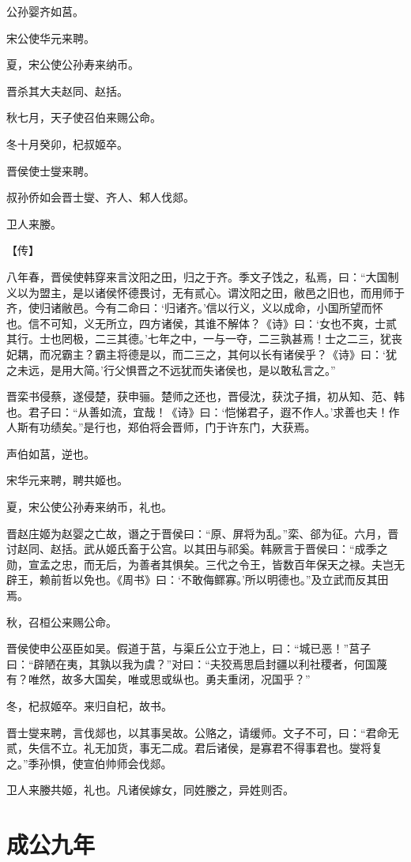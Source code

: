 \documentclass[a4paper,12pt,UTF8,twoside]{ctexbook}
\begin{document}
公孙婴齐如莒。

宋公使华元来聘。

夏，宋公使公孙寿来纳币。

晋杀其大夫赵同、赵括。

秋七月，天子使召伯来赐公命。

冬十月癸卯，杞叔姬卒。

晋侯使士燮来聘。

叔孙侨如会晋士燮、齐人、邾人伐郯。

卫人来媵。

【传】

八年春，晋侯使韩穿来言汶阳之田，归之于齐。季文子饯之，私焉，曰：“大国制义以为盟主，是以诸侯怀德畏讨，无有贰心。谓汶阳之田，敝邑之旧也，而用师于齐，使归诸敝邑。今有二命曰：‘归诸齐。’信以行义，义以成命，小国所望而怀也。信不可知，义无所立，四方诸侯，其谁不解体？《诗》曰：‘女也不爽，士贰其行。士也罔极，二三其德。’七年之中，一与一夺，二三孰甚焉！士之二三，犹丧妃耦，而况霸主？霸主将德是以，而二三之，其何以长有诸侯乎？《诗》曰：‘犹之未远，是用大简。’行父惧晋之不远犹而失诸侯也，是以敢私言之。”

晋栾书侵蔡，遂侵楚，获申骊。楚师之还也，晋侵沈，获沈子揖，初从知、范、韩也。君子曰：“从善如流，宜哉！《诗》曰：‘恺悌君子，遐不作人。’求善也夫！作人斯有功绩矣。”是行也，郑伯将会晋师，门于许东门，大获焉。

声伯如莒，逆也。

宋华元来聘，聘共姬也。

夏，宋公使公孙寿来纳币，礼也。

晋赵庄姬为赵婴之亡故，谮之于晋侯曰：“原、屏将为乱。”栾、郤为征。六月，晋讨赵同、赵括。武从姬氏畜于公宫。以其田与祁奚。韩厥言于晋侯曰：“成季之勋，宣孟之忠，而无后，为善者其惧矣。三代之令王，皆数百年保天之禄。夫岂无辟王，赖前哲以免也。《周书》曰：‘不敢侮鳏寡。’所以明德也。”及立武而反其田焉。

秋，召桓公来赐公命。

晋侯使申公巫臣如吴。假道于莒，与渠丘公立于池上，曰：“城已恶！”莒子曰：“辟陋在夷，其孰以我为虞？”对曰：“夫狡焉思启封疆以利社稷者，何国蔑有？唯然，故多大国矣，唯或思或纵也。勇夫重闭，况国乎？”

冬，杞叔姬卒。来归自杞，故书。

晋士燮来聘，言伐郯也，以其事吴故。公赂之，请缓师。文子不可，曰：“君命无贰，失信不立。礼无加货，事无二成。君后诸侯，是寡君不得事君也。燮将复之。”季孙惧，使宣伯帅师会伐郯。

卫人来媵共姬，礼也。凡诸侯嫁女，同姓媵之，异姓则否。


\section{成公九年}
\end{document}
